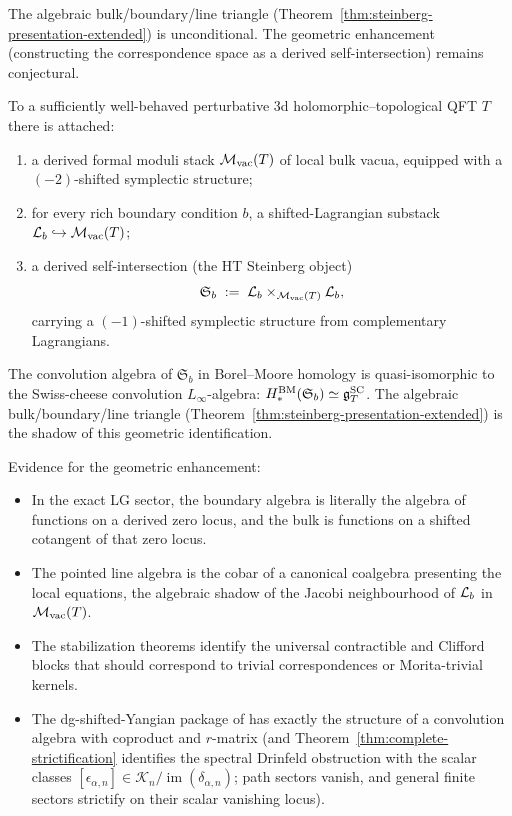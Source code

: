 The algebraic bulk/boundary/line triangle
(Theorem~\ref{thm:steinberg-presentation-extended}) is unconditional.
The geometric enhancement (constructing the correspondence space
as a derived self-intersection) remains conjectural.

\begin{conjecture}
\label{conj:geometric-steinberg}
To a sufficiently well-behaved perturbative 3d
holomorphic--topological QFT $T$ there is attached:
\begin{enumerate}[label=\textup{(\alph*)}]
\item a derived formal moduli stack $\mathcal M_{\mathrm{vac}}(T)$ of
 local bulk vacua, equipped with a $(-2)$-shifted symplectic
 structure;
\item for every rich boundary condition $b$, a shifted-Lagrangian
 substack $\mathcal L_b \hookrightarrow \mathcal M_{\mathrm{vac}}(T)$;
\item a derived self-intersection (the HT Steinberg object)
 \[
 \mathfrak S_b
 \;:=\;
 \mathcal L_b \times_{\mathcal M_{\mathrm{vac}}(T)} \mathcal L_b,
 \]
 carrying a $(-1)$-shifted symplectic structure from
 complementary Lagrangians.
\end{enumerate}
The convolution algebra of $\mathfrak S_b$ in Borel--Moore homology
is quasi-isomorphic to the Swiss-cheese convolution $L_\infty$-algebra:
$H_*^{\mathrm{BM}}(\mathfrak S_b) \simeq \mathfrak{g}^{\mathrm{SC}}_T$.
The algebraic bulk/boundary/line triangle
\textup{(}Theorem~\textup{\ref{thm:steinberg-presentation-extended}}\textup{)}
is the shadow of this geometric identification.
\end{conjecture}

Evidence for the geometric enhancement:
\begin{itemize}[leftmargin=1.8em]
\item In the exact LG sector, the boundary algebra is literally
 the algebra of functions on a derived zero locus, and the bulk
 is functions on a shifted cotangent of that zero locus.
\item The pointed line algebra is the cobar of a canonical coalgebra
 presenting the local equations, the algebraic shadow of the
 Jacobi neighbourhood of $\mathcal L_b$ in $\mathcal M_{\mathrm{vac}}(T)$.
\item The stabilization theorems identify the universal contractible
 and Clifford blocks that should correspond to trivial
 correspondences or Morita-trivial kernels.
\item The dg-shifted-Yangian package of \cite{DNP25} has exactly
 the structure of a convolution algebra with coproduct and
 $r$-matrix
 (and Theorem~\ref{thm:complete-strictification} identifies the
 spectral Drinfeld obstruction with the scalar classes
 $[\epsilon_{\alpha,n}]\in
 \mathscr K_n/\operatorname{im}(\delta_{\alpha,n})$; path sectors
 vanish, and general finite sectors strictify on their scalar
 vanishing locus).
\end{itemize}

